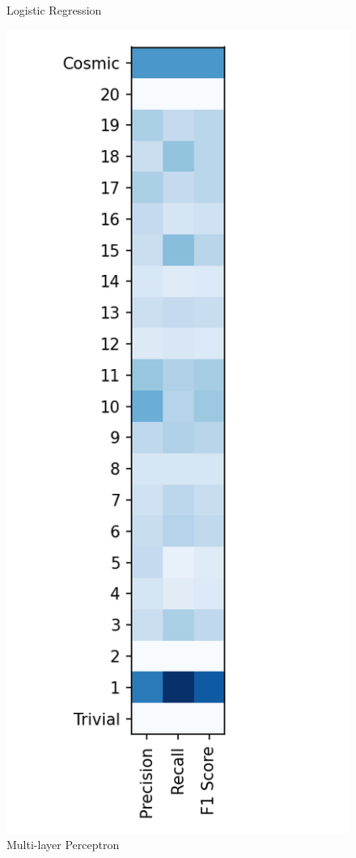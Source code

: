 \documentclass{article}
\begin{document}
\begin{figure}[ht]
\begin{minipage}[b]{0.32\linewidth}
			\caption*{Logistic Regression} 
			\vspace{10ex}
		\end{minipage}\hfill
		\begin{minipage}[b]{0.32\linewidth}
			\centering
			\includegraphics[width=\linewidth]{22 - Multi-layer Perceptron.png} 
			\caption*{Multi-layer Perceptron} 
			\vspace{10ex}
		\end{minipage}
	\end{figure}
\end{document}

